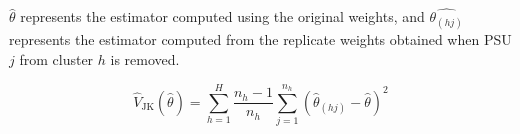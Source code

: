 \documentclass{juliacon}
\begin{document}
$\hat{\theta}$ represents the estimator computed using the original weights, and $\hat{\theta_{(hj)}}$ represents the estimator computed from the replicate weights obtained when PSU $j$ from cluster $h$ is removed.

\begin{equation}
\hat{V}_{\text{JK}}(\hat{\theta}) = \sum_{h = 1}^H \dfrac{n_h - 1}{n_h}\sum_{j = 1}^{n_h}(\hat{\theta}_{(hj)} - \hat{\theta})^2
\end{equation}





\end{document}
